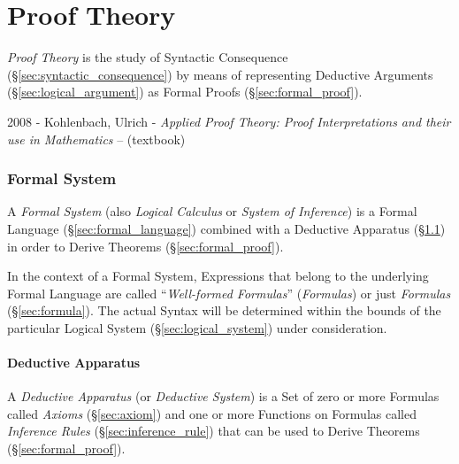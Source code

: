 \part{Proof Theory}\label{sec:proof_theory}

\emph{Proof Theory} is the study of Syntactic Consequence
(\S\ref{sec:syntactic_consequence}) by means of representing Deductive
Arguments (\S\ref{sec:logical_argument}) as Formal Proofs
(\S\ref{sec:formal_proof}).

2008 - Kohlenbach, Ulrich - \emph{Applied Proof Theory: Proof Interpretations
  and their use in Mathematics} -- (textbook)



\section{Formal System}\label{sec:formal_system}

A \emph{Formal System} (also \emph{Logical Calculus} or \emph{System
  of Inference}) is a Formal Language (\S\ref{sec:formal_language})
combined with a Deductive Apparatus (\S\ref{sec:deductive_apparatus})
in order to Derive Theorems (\S\ref{sec:formal_proof}).

In the context of a Formal System, Expressions that belong to the
underlying Formal Language are called ``\emph{Well-formed Formulas}''
(\emph{Formulas}) or just \emph{Formulas} (\S\ref{sec:formula}). The
actual Syntax will be determined within the bounds of the particular
Logical System (\S\ref{sec:logical_system}) under consideration.



\subsection{Deductive Apparatus}\label{sec:deductive_apparatus}

A \emph{Deductive Apparatus} (or \emph{Deductive System}) is a Set of
zero or more Formulas called \emph{Axioms} (\S\ref{sec:axiom}) and one or
more Functions on Formulas called \emph{Inference Rules}
(\S\ref{sec:inference_rule}) that can be used to Derive Theorems
(\S\ref{sec:formal_proof}).

